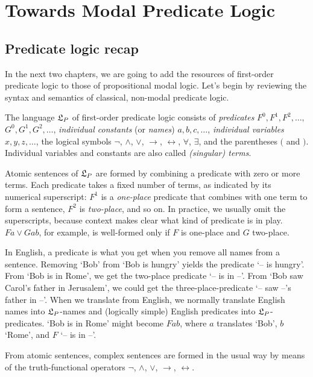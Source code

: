 \chapter{Towards Modal Predicate Logic}\label{ch:qml}


\section{Predicate logic recap}

In the next two chapters, we are going to add the resources of first-order
predicate logic to those of propositional modal logic. Let's begin by reviewing
the syntax and semantics of classical, non-modal predicate logic.

The language $\mathfrak{L}_P$ of first-order predicate logic consists of \emph{predicates}
$F^{0},F^1,F^2,\ldots,$ $G^{0},G^1,G^2,\ldots$, \emph{individual constants} (or
\emph{names}) $a,b,c,\ldots$, \emph{individual variables} $x,y,z,\ldots$, the
logical symbols $\neg$, $\land$, $\lor$, $\to$, $\leftrightarrow$, $\forall$,
$\exists$, and the parentheses $($ and $)$. Individual variables and constants
are also called \emph{(singular) terms}.

Atomic sentences of $\mathfrak{L}_{P}$ are formed by combining a predicate with zero or
more terms. Each predicate takes a fixed number of terms, as indicated by its
numerical superscript: $F^1$ is a \emph{one-place} predicate that combines with
one term to form a sentence, $F^2$ is \emph{two-place}, and so on. In practice,
we usually omit the superscripts, because context makes clear what kind of
predicate is in play. $Fa \lor Gab$, for example, is well-formed only if $F$ is
one-place and $G$ two-place.

In English, a predicate is what you get when you remove all names from a
sentence. Removing `Bob' from `Bob is hungry' yields the predicate `-- is
hungry'. From `Bob is in Rome', we get the two-place predicate `-- is in --'.
From `Bob saw Carol's father in Jerusalem', we could get the
three-place-predicate `-- saw --'s father in --'. When we translate from
English, we normally translate English names into $\mathfrak{L}_P$-names and (logically
simple) English predicates into $\mathfrak{L}_P$-predicates. `Bob is in Rome' might become
$Fab$, where $a$ translates `Bob', $b$ `Rome', and $F$ `-- is in --'.

From atomic sentences, complex sentences are formed in the usual way by means of
the truth-functional operators $\neg$, $\land$, $\lor$, $\to$,
$\leftrightarrow$.


